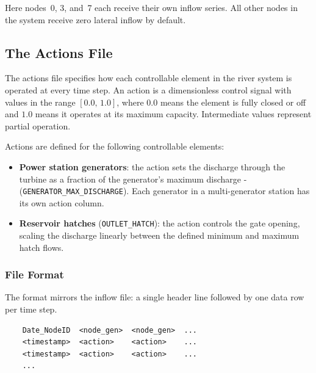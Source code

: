 \documentclass[a4paper, 12pt]{report}
\begin{document}
	Here nodes~0, 3, and~7 each receive their own inflow series. All other nodes in the system
	receive zero lateral inflow by default.


	
	\subsection{The Actions File}
	\label{sec:actionsfile}

	The actions file specifies how each controllable element in the river system is operated
	at every time step. An action is a dimensionless control signal with values in the range
	$[0.0,\, 1.0]$, where $0.0$ means the element is fully closed or off and $1.0$ means
	it operates at its maximum capacity. Intermediate values represent partial operation.

	Actions are defined for the following controllable elements:

	\begin{itemize}
	\item \textbf{Power station generators}: the action sets the discharge through the
	turbine as a fraction of the generator's maximum discharge - \\ 
	(\texttt{GENERATOR\_MAX\_DISCHARGE}). Each generator in a multi-generator station
	has its own action column.
	\item \textbf{Reservoir hatches} (\texttt{OUTLET\_HATCH}): the action controls the
	gate opening, scaling the discharge linearly between the defined minimum and
	maximum hatch flows.
	\end{itemize}

	\subsubsection{File Format}

	The format mirrors the inflow file: a single header line followed by one data row per
	time step.

	\begin{verbatim}
	Date_NodeID  <node_gen>  <node_gen>  ...
	<timestamp>  <action>    <action>    ...
	<timestamp>  <action>    <action>    ...
	...
	\end{verbatim}
\end{document}
